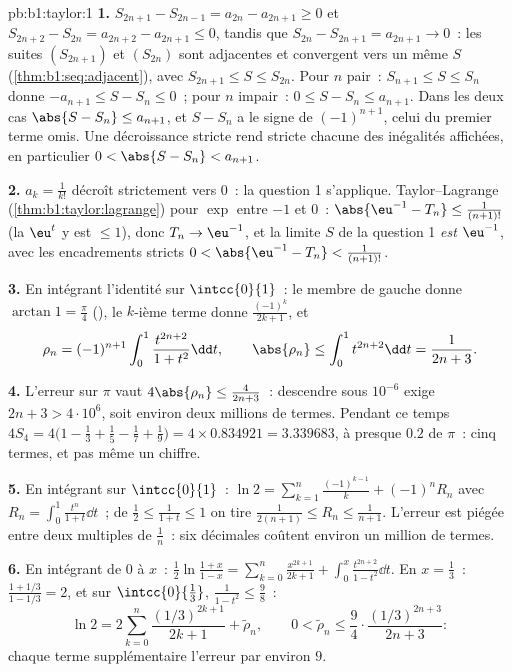 \begin{solution}{pb:b1:taylor:1}
\textbf{1.} $S_{2n+1} - S_{2n-1} = a_{2n} - a_{2n+1} \geq 0$ et
$S_{2n+2} - S_{2n} = a_{2n+2} - a_{2n+1} \leq 0$, tandis que $S_{2n}
- S_{2n+1} = a_{2n+1} \to 0$~: les suites $(S_{2n+1})$ et
$(S_{2n})$ sont adjacentes et convergent vers un même $S$
(\cref{thm:b1:seq:adjacent}), avec $S_{2n+1} \leq S \leq S_{2n}$.
Pour $n$ pair~: $S_{n+1} \leq S \leq S_n$ donne $-a_{n+1} \leq S -
S_n \leq 0$~; pour $n$ impair~: $0 \leq S - S_n \leq a_{n+1}$. Dans les
deux cas $\abs{S - S_n} \leq a_{n+1}$, et $S - S_n$ a le signe de
$(-1)^{n+1}$, celui du premier terme omis. Une décroissance stricte
rend stricte chacune des inégalités affichées, en particulier $0 <
\abs{S - S_n} < a_{n+1}$.

\textbf{2.} $a_k = \frac{1}{k!}$ décroît strictement vers $0$~: la
question 1 s'applique. Taylor--Lagrange
(\cref{thm:b1:taylor:lagrange}) pour $\exp$ entre $-1$ et $0$~:
$\abs{\eu^{-1} - T_n} \leq \frac{1}{(n+1)!}$ (la 
$\eu^t$ y est $\leq 1$), donc $T_n \to \eu^{-1}$, et la limite
$S$ de la question 1 \emph{est} $\eu^{-1}$, avec les encadrements
stricts $0 < \abs{\eu^{-1} - T_n} < \frac{1}{(n+1)!}$.

\textbf{3.} En intégrant l'identité sur $\intcc{0}{1}$~: le
membre de gauche donne $\arctan 1 = \frac\pi4$ (), le $k$-ième terme donne $\frac{(-1)^k}{2k+1}$, et
\[
\rho_n = (-1)^{n+1}\int_0^1 \frac{t^{2n+2}}{1+t^2}\dd t,
\qquad
\abs{\rho_n} \leq \int_0^1 t^{2n+2}\dd t = \frac{1}{2n+3} .
\]

\textbf{4.} L'erreur sur $\pi$ vaut $4\abs{\rho_n} \leq
\frac{4}{2n+3}$~: descendre sous $10^{-6}$ exige $2n + 3 > 4\cdot10^6$,
soit environ deux millions de termes. Pendant ce temps $4S_4 = 4\bigl(1
- \frac13 + \frac15 - \frac17 + \frac19\bigr) = 4 \times 0.834921 =
3.339683$, à presque $0.2$ de $\pi$~: cinq termes, et pas même
un chiffre.

\textbf{5.} En intégrant sur $\intcc{0}{1}$~: $\ln 2 =
\sum_{k=1}^{n} \frac{(-1)^{k-1}}{k} + (-1)^n R_n$ avec $R_n =
\int_0^1 \frac{t^n}{1+t}\dd t$~; de $\frac12 \leq \frac{1}{1+t}
\leq 1$ on tire $\frac{1}{2(n+1)} \leq R_n \leq \frac{1}{n+1}$.
L'erreur est piégée entre deux multiples de $\frac1n$~: six
décimales coûtent environ un million de termes.

\textbf{6.} En intégrant de $0$ à $x$~: $\frac12\ln\frac{1 +
x}{1 - x} = \sum_{k=0}^{n} \frac{x^{2k+1}}{2k+1} + \int_0^x
\frac{t^{2n+2}}{1-t^2}\dd t$. En $x = \frac13$~: $\frac{1 +
1/3}{1 - 1/3} = 2$, et sur $\intcc{0}{\frac13}$, $\frac{1}{1 -
t^2} \leq \frac98$~:
\[
\ln 2 = 2\sum_{k=0}^{n} \frac{(1/3)^{2k+1}}{2k+1} +
\tilde\rho_n,
\qquad
0 < \tilde\rho_n \leq \frac{9}{4}\cdot
\frac{(1/3)^{2n+3}}{2n+3} :
\]
chaque terme supplémentaire  l'erreur par environ $9$.


\end{solution}
